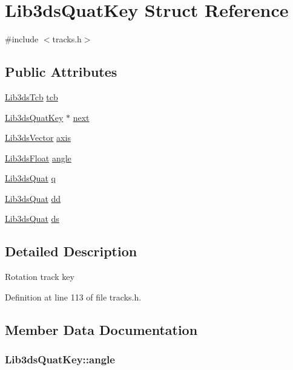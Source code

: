 \hypertarget{struct_lib3ds_quat_key}{\section{Lib3ds\-Quat\-Key Struct Reference}
\label{struct_lib3ds_quat_key}
}


{\ttfamily \#include $<$tracks.\-h$>$}

\subsection*{Public Attributes}
\begin{DoxyCompactItemize}
\item 
\hyperlink{struct_lib3ds_tcb}{Lib3ds\-Tcb} \hyperlink{struct_lib3ds_quat_key_a00687bf10f098cb71e2d63d1c4681b53}{tcb}
\item 
\hyperlink{struct_lib3ds_quat_key}{Lib3ds\-Quat\-Key} $\ast$ \hyperlink{struct_lib3ds_quat_key_a04b957a9e5ba279aea5655c137544187}{next}
\item 
\hyperlink{group__vector_ga6ac1c3b3ef15381ebf6baf264d658dcf}{Lib3ds\-Vector} \hyperlink{struct_lib3ds_quat_key_a8aeb79f1e1ec38db116e100defe3c0e0}{axis}
\item 
\hyperlink{types_8h_ab18e70f51f9a53c9dee8d930c8e1a7bf}{Lib3ds\-Float} \hyperlink{struct_lib3ds_quat_key_a053506d1ea2e43086cff2bd96d0af9f3}{angle}
\item 
\hyperlink{group__quat_ga9969ef1e618ba698c4b8374f14b548be}{Lib3ds\-Quat} \hyperlink{struct_lib3ds_quat_key_af2bb7002fe26aa03689290ceaa098f18}{q}
\item 
\hyperlink{group__quat_ga9969ef1e618ba698c4b8374f14b548be}{Lib3ds\-Quat} \hyperlink{struct_lib3ds_quat_key_a0e0d0109419c7fe7bd4235419e1444fc}{dd}
\item 
\hyperlink{group__quat_ga9969ef1e618ba698c4b8374f14b548be}{Lib3ds\-Quat} \hyperlink{struct_lib3ds_quat_key_a6641207a7a9d915611f872be6457cf54}{ds}
\end{DoxyCompactItemize}


\subsection{Detailed Description}
Rotation track key 

Definition at line 113 of file tracks.\-h.



\subsection{Member Data Documentation}
\hypertarget{struct_lib3ds_quat_key_a053506d1ea2e43086cff2bd96d0af9f3}{
\subsubsection[{angle}]{ Lib3ds\-Quat\-Key\-::angle}}\label{struct_lib3ds_quat_key_a053506d1ea2e43086cff2bd96d0af9f3}


